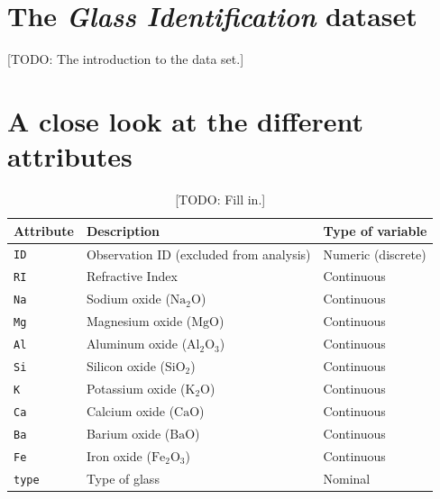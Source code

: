 \documentclass[dtu]{dtuarticle}
\newcommand{\todo}[1]{\color{red}[TODO: #1]\color{black}}
\newcommand*\chem[1]{\ensuremath{\mathrm{#1}}}
\begin{document}
	\tableofcontents

	\newpage

	\section{The \textit{Glass Identification} dataset}

	\todo{The introduction to the data set.}

	\section{A close look at the different attributes}

	\begin{table}
		\centering
		\begin{tabular}{l|l|l}
			\textbf{Attribute} & \textbf{Description}                    & \textbf{Type of variable} \\ \hline \hline
			\texttt{ID}        & Observation ID (excluded from analysis) & Numeric (discrete)        \\ \hline
			\texttt{RI}        & Refractive Index                        & Continuous                \\ \hline
			\texttt{Na}        & Sodium oxide ($\chem{Na_2 O}$)          & Continuous                \\ \hline
			\texttt{Mg}        & Magnesium oxide ($\chem{Mg O}$)         & Continuous                \\ \hline
			\texttt{Al}        & Aluminum oxide ($\chem{Al_2 O_3}$)      & Continuous                \\ \hline
			\texttt{Si}        & Silicon oxide ($\chem{Si O_2}$)         & Continuous                \\ \hline
			\texttt{K}         & Potassium oxide ($\chem{K_2 O}$)        & Continuous                \\ \hline
			\texttt{Ca}        & Calcium oxide ($\chem{Ca O }$)          & Continuous                \\ \hline
			\texttt{Ba}        & Barium oxide ($\chem{Ba O}$)            & Continuous                \\ \hline
			\texttt{Fe}        & Iron oxide ($\chem{Fe_2 O_3}$)          & Continuous                \\ \hline
			\texttt{type}      & Type of glass                           & Nominal                   \\
		\end{tabular}
		\caption{\todo{Fill in.}}
		\label{table:attributes}
	\end{table}
\end{document}
